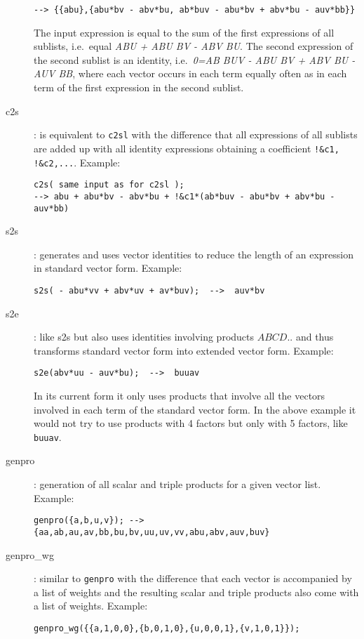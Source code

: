 \documentclass[12pt]{article}
\begin{document}
\begin{description}
\begin{verbatim}
--> {{abu},{abu*bv - abv*bu, ab*buv - abu*bv + abv*bu - auv*bb}}
\end{verbatim}
  The input expression is equal to the sum of the first expressions of
  all sublists, i.e.\ equal {\it ABU + ABU BV - ABV BU}. The second
  expression of the second sublist is an identity,
  i.e.\ {\it 0=AB BUV - ABU BV + ABV BU - AUV BB}, where each vector
  occurs in each term equally often as in each term of the first expression
  in the second sublist.
  \item[c2s] : is equivalent to {\tt c2sl} with the difference that all %
  expressions of all sublists are added up with all identity expressions
  obtaining a coefficient \verb+!&c1, !&c2,...+. Example: \begin{verbatim}
c2s( same input as for c2sl );
--> abu + abu*bv - abv*bu + !&c1*(ab*buv - abu*bv + abv*bu - auv*bb)\end{verbatim}
  \item[s2s] : generates and uses vector identities to reduce the length of an
        expression in standard vector form. Example: \begin{verbatim}
s2s( - abu*vv + abv*uv + av*buv);  -->  auv*bv \end{verbatim}
  \item[s2e] : like s2s but also uses identities involving products
        $ABCD..$ and thus transforms standard vector form into extended
        vector form. Example:
        \begin{verbatim}
s2e(abv*uu - auv*bu);  -->  buuav \end{verbatim}
        In its current form it only uses products that involve all
        the vectors involved in each term of the standard vector form.
        In the above example it would not try to use products with 4
        factors but only with 5 factors, like {\tt buuav}.
  \item[genpro] : generation of all scalar and triple products for a given
        vector list. Example: \begin{verbatim}
genpro({a,b,u,v}); --> {aa,ab,au,av,bb,bu,bv,uu,uv,vv,abu,abv,auv,buv} \end{verbatim}
  \item[genpro\_wg] :
        similar to {\tt genpro} with the difference that each vector
        is accompanied by a list of weights and the resulting scalar
        and triple products also come with a list of weights.
        Example: \begin{verbatim}
genpro_wg({{a,1,0,0},{b,0,1,0},{u,0,0,1},{v,1,0,1}});

\end{verbatim}
\end{description}
\end{document}
